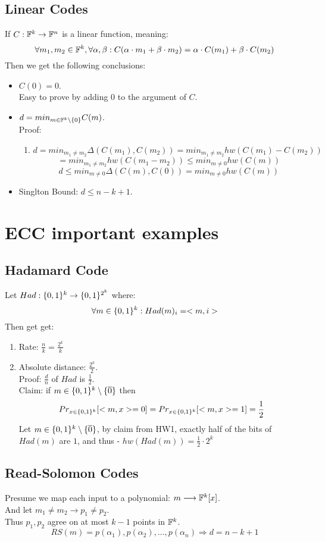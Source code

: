 \subsection*{Linear Codes}
If $C:\mathbb{F}^k\rightarrow\mathbb{F}^n$ is a linear function, meaning:
\[
	\forall m_1,m_2\in\mathbb{F}^k, \forall \alpha,\beta:	
	C(\alpha\cdot m_1+\beta\cdot m_2)=\alpha\cdot C(m_1)+\beta\cdot C(m_2)
\]
Then we get the following conclusions:
\begin{itemize}
	\item $C(0)=0$.\\
	Easy to prove by adding 0 to the argument of $C$.
	\item $d=min_{m\in\mathbb{F}^k\setminus\{0\}}C(m)$.\\
	Proof:
	\begin{enumerate}
		\item 
		\[
			d=min_{m_1\neq m_2}\Delta (C(m_1), C(m_2))
			=min_{m_1\neq m_2}hw(C(m_1)-C(m_2))
		\]\[
			=min_{m_1\neq m_2}hw(C(m_1-m_2))
			\leq min_{m\neq 0}hw(C(m))
		\]
		\[
			d\leq min_{m\neq 0} \Delta(C(m), C(0))
			=min_{m\neq 0}hw(C(m)) 	
		\]
	\end{enumerate}
	\item Singlton Bound: $d\leq n-k+1$.\\
\end{itemize}

\section*{ECC important examples}
\subsection*{Hadamard Code}
Let $Had:\{0,1\}^k\rightarrow \{0,1\}^{2^k}$ where:
\[
	\forall m\in \{0,1\}^k: Had(m)_i=<m,i>	
\]
Then get get:
\begin{enumerate}
	\item Rate: $\frac{n}{k}=\frac{2^k}{k}$
	\item Absolute distance: $\frac{2^k}{2}$.\\
	Proof: $\frac{d}{n}$ of $Had$ is $\frac{1}{2}$.\\
	Claim: if $m\in\{0,1\}^k\setminus\{\overline{0}\}$ then
	\[
		Pr_{x\in\{0,1\}^k}[<m,x>=0]
		=Pr_{x\in\{0,1\}^k}[<m,x>=1]
		=\frac{1}{2}	
	\]
	Let $m\in\{0,1\}^k\setminus\{\overline{0}\}$,
	by claim from HW1, exactly half of the bits of $Had(m)$
	are $1$, and thus - $hw(Had(m))=\frac{1}{2}\cdot 2^k$
\end{enumerate}

\subsection*{Read-Solomon Codes}
Presume we map each input
to a polynomial: 
$m\longrightarrow \mathbb{F}^k[x]$.\\
And let $m_1\neq m_2\longrightarrow p_1\neq p_2$.\\
Thus $p_1, p_2$ agree on at most $k-1$ points in $\mathbb{F}^k$.\\

\[
	RS(m)=p(\alpha_1), p(\alpha_2), \dots, p(\alpha_n)	
	\Rightarrow d=n-k+1
\]

